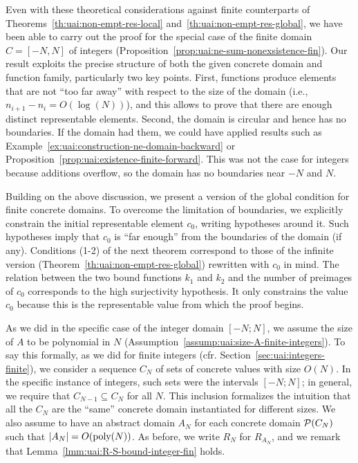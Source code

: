Even with these theoretical considerations against finite counterparts of Theorems~\ref{th:uai:non-empt-res-local} and~\ref{th:uai:non-empt-res-global}, we have been able to carry out the proof for the special case of the finite domain $C = [-N, N]$ of integers (Proposition~\ref{prop:uai:ne-sum-nonexsistence-fin}). Our result exploits the precise structure of both the given concrete domain and function family, particularly two key points.
First, functions produce elements that are not ``too far away'' with respect to the size of the domain (i.e., $n_{i+1} - n_{i} = O(\log(N))$), and this allows to prove that there are enough distinct representable elements.
Second, the domain is circular and hence has no boundaries. If the domain had them, we could have applied results such as Example~\ref{ex:uai:construction-ne-domain-backward} or Proposition~\ref{prop:uai:existence-finite-forward}. This was not the case for integers because additions overflow, so the domain has no boundaries near $-N$ and $N$.

Building on the above discussion, we present a version of the global condition for finite concrete domains. To overcome the limitation of boundaries, we explicitly constrain the initial representable element $c_0$, writing hypotheses around it. Such hypotheses imply that $c_0$ is ``far enough'' from the boundaries of the domain (if any).
Conditions (1-2) of the next theorem correspond to those of the infinite version (Theorem~\ref{th:uai:non-empt-res-global}) rewritten with $c_0$ in mind. The relation between the two bound functions $k_1$ and $k_2$ and the number of preimages of $c_0$ corresponds to the high surjectivity hypothesis. It only constrains the value $c_0$ because this is the representable value from which the proof begins.

As we did in the specific case of the integer domain $[-N; N]$, we assume the size of $A$ to be polynomial in $N$ (Assumption~\ref{assump:uai:size-A-finite-integers}). To say this formally, as we did for finite integers (cfr. Section~\ref{sec:uai:integers-finite}), we consider a sequence $C_N$ of sets of concrete values with size $O(N)$. In the specific instance of integers, such sets were the intervals $[-N; N]$; in general, we require that $C_{N-1} \subseteq C_N$ for all $N$. This inclusion formalizes the intuition that all the $C_N$ are the ``same'' concrete domain instantiated for different sizes.
We also assume to have an abstract domain $A_N$ for each concrete domain $\mathcal{P}(C_N)$ such that $\lvert A_N\rvert = O(\text{poly}(N))$. As before, we write $R_N$ for $R_{A_N}$, and we remark that Lemma~\ref{lmm:uai:R-S-bound-integer-fin} holds.

